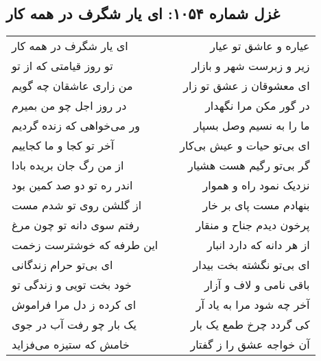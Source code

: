 \begin{center}
\section*{غزل شماره ۱۰۵۴: ای یار شگرف در همه کار}
\label{sec:1054}
\begin{longtable}{l p{0.5cm} r}
ای یار شگرف در همه کار
&&
عیاره و عاشق تو عیار
\\
تو روز قیامتی که از تو
&&
زیر و زبرست شهر و بازار
\\
من زاری عاشقان چه گویم
&&
ای معشوقان ز عشق تو زار
\\
در روز اجل چو من بمیرم
&&
در گور مکن مرا نگهدار
\\
ور می‌خواهی که زنده گردیم
&&
ما را به نسیم وصل بسپار
\\
آخر تو کجا و ما کجاییم
&&
ای بی‌تو حیات و عیش بی‌کار
\\
از من رگ جان بریده بادا
&&
گر بی‌تو رگیم هست هشیار
\\
اندر ره تو دو صد کمین بود
&&
نزدیک نمود راه و هموار
\\
از گلشن روی تو شدم مست
&&
بنهادم مست پای بر خار
\\
رفتم سوی دانه تو چون مرغ
&&
پرخون دیدم جناح و منقار
\\
این طرفه که خوشترست زخمت
&&
از هر دانه که دارد انبار
\\
ای بی‌تو حرام زندگانی
&&
ای بی‌تو نگشته بخت بیدار
\\
خود بخت تویی و زندگی تو
&&
باقی نامی و لاف و آزار
\\
ای کرده ز دل مرا فراموش
&&
آخر چه شود مرا به یاد آر
\\
یک بار چو رفت آب در جوی
&&
کی گردد چرخ طمع یک بار
\\
خامش که ستیزه می‌فزاید
&&
آن خواجه عشق را ز گفتار
\\
\end{longtable}
\end{center}
